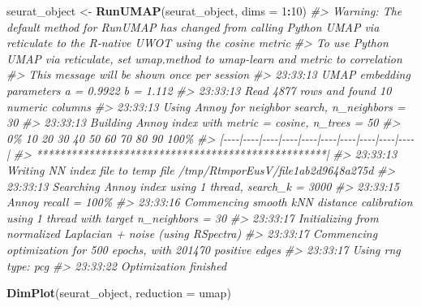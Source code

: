 \documentclass[
]{book}
\newenvironment{Shaded}{\begin{snugshade}}{\end{snugshade}}
\newcommand{\AttributeTok}[1]{\textcolor[rgb]{0.13,0.29,0.53}{#1}}
\newcommand{\CommentTok}[1]{\textcolor[rgb]{0.56,0.35,0.01}{\textit{#1}}}
\newcommand{\DecValTok}[1]{\textcolor[rgb]{0.00,0.00,0.81}{#1}}
\newcommand{\FunctionTok}[1]{\textcolor[rgb]{0.13,0.29,0.53}{\textbf{#1}}}
\newcommand{\NormalTok}[1]{#1}
\newcommand{\OtherTok}[1]{\textcolor[rgb]{0.56,0.35,0.01}{#1}}
\newcommand{\SpecialCharTok}[1]{\textcolor[rgb]{0.81,0.36,0.00}{\textbf{#1}}}
\newcommand{\StringTok}[1]{\textcolor[rgb]{0.31,0.60,0.02}{#1}}
\begin{document}
\begin{Shaded}
\begin{Highlighting}[]
\NormalTok{seurat\_object }\OtherTok{\textless{}{-}} \FunctionTok{RunUMAP}\NormalTok{(seurat\_object, }\AttributeTok{dims =} \DecValTok{1}\SpecialCharTok{:}\DecValTok{10}\NormalTok{)}
\CommentTok{\#\textgreater{} Warning: The default method for RunUMAP has changed from calling Python UMAP via reticulate to the R{-}native UWOT using the cosine metric}
\CommentTok{\#\textgreater{} To use Python UMAP via reticulate, set umap.method to \textquotesingle{}umap{-}learn\textquotesingle{} and metric to \textquotesingle{}correlation\textquotesingle{}}
\CommentTok{\#\textgreater{} This message will be shown once per session}
\CommentTok{\#\textgreater{} 23:33:13 UMAP embedding parameters a = 0.9922 b = 1.112}
\CommentTok{\#\textgreater{} 23:33:13 Read 4877 rows and found 10 numeric columns}
\CommentTok{\#\textgreater{} 23:33:13 Using Annoy for neighbor search, n\_neighbors = 30}
\CommentTok{\#\textgreater{} 23:33:13 Building Annoy index with metric = cosine, n\_trees = 50}
\CommentTok{\#\textgreater{} 0\%   10   20   30   40   50   60   70   80   90   100\%}
\CommentTok{\#\textgreater{} [{-}{-}{-}{-}|{-}{-}{-}{-}|{-}{-}{-}{-}|{-}{-}{-}{-}|{-}{-}{-}{-}|{-}{-}{-}{-}|{-}{-}{-}{-}|{-}{-}{-}{-}|{-}{-}{-}{-}|{-}{-}{-}{-}|}
\CommentTok{\#\textgreater{} **************************************************|}
\CommentTok{\#\textgreater{} 23:33:13 Writing NN index file to temp file /tmp/RtmporEusV/file1ab2d9648a275d}
\CommentTok{\#\textgreater{} 23:33:13 Searching Annoy index using 1 thread, search\_k = 3000}
\CommentTok{\#\textgreater{} 23:33:15 Annoy recall = 100\%}
\CommentTok{\#\textgreater{} 23:33:16 Commencing smooth kNN distance calibration using 1 thread with target n\_neighbors = 30}
\CommentTok{\#\textgreater{} 23:33:17 Initializing from normalized Laplacian + noise (using RSpectra)}
\CommentTok{\#\textgreater{} 23:33:17 Commencing optimization for 500 epochs, with 201470 positive edges}
\CommentTok{\#\textgreater{} 23:33:17 Using rng type: pcg}
\CommentTok{\#\textgreater{} 23:33:22 Optimization finished}
\end{Highlighting}
\end{Shaded}

\begin{Shaded}
\begin{Highlighting}[]
\FunctionTok{DimPlot}\NormalTok{(seurat\_object, }\AttributeTok{reduction =} \StringTok{\textquotesingle{}umap\textquotesingle{}}\NormalTok{)}
\end{Highlighting}
\end{Shaded}
\end{document}
